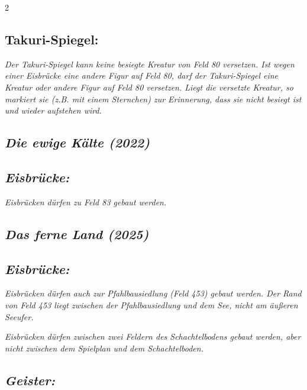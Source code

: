 \documentclass[10pt, a4paper, oneside]{book}
\newcommand{\fan}[1]{\textit{#1}}
\begin{document}
\begin{multicols*}{2}
\begin{bgcolor}[color-AG]
\subsection{Takuri-Spiegel:}

\fan{Der Takuri-Spiegel kann keine besiegte Kreatur von Feld 80 versetzen. Ist wegen einer Eisbrücke eine andere Figur auf Feld 80, darf der Takuri-Spiegel eine Kreatur oder andere Figur auf Feld 80 versetzen. Liegt die versetzte Kreatur, so markiert sie (z.B. mit einem Sternchen) zur Erinnerung, dass sie nicht besiegt ist und wieder aufstehen wird.}

\end{bgcolor}




\begin{bgcolor}
\section{\fan{Die ewige Kälte (2022)}}

\subsection{\fan{Eisbrücke:}}

\fan{Eisbrücken dürfen zu Feld 83 gebaut werden.}

\end{bgcolor}



\columnbreak


\begin{bgcolor}
\section{\fan{Das ferne Land (2025)}}

\subsection{\fan{Eisbrücke:}}

\fan{Eisbrücken dürfen auch zur Pfahlbausiedlung (Feld 453) gebaut werden. Der Rand von Feld 453 liegt zwischen der Pfahlbausiedlung und dem See, nicht am äußeren Seeufer.}

\fan{Eisbrücken dürfen zwischen zwei Feldern des Schachtelbodens gebaut werden, aber nicht zwischen dem Spielplan und dem Schachtelboden.}


\subsection{\fan{Geister:}}


\end{bgcolor}
\end{multicols*}
\end{document}

